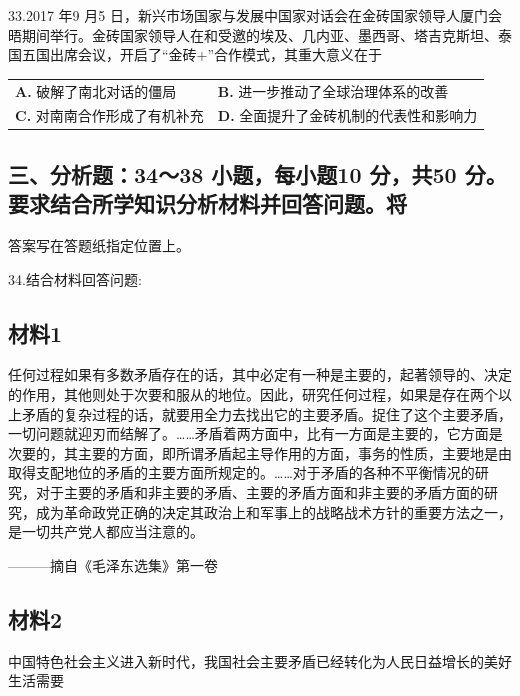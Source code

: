 \documentclass[UTF8,11pt]{ctexart}
\begin{document}
33.2017 年9 月5 日，新兴市场国家与发展中国家对话会在金砖国家领导人厦门会晤期间举行。金砖国家领导人在和受邀的埃及、几内亚、墨西哥、塔吉克斯坦、泰国五国出席会议，开启了“金砖+”合作模式，其重大意义在于


\begin{center}\begin{tabular}{>{\raggedright\arraybackslash}p{\dimexpr(\linewidth-4\tabcolsep)/2\relax}>{\raggedright\arraybackslash}p{\dimexpr(\linewidth-4\tabcolsep)/2\relax}}
\textbf{A.} 破解了南北对话的僵局 & \textbf{B.} 进一步推动了全球治理体系的改善\\[.35em]
\textbf{C.} 对南南合作形成了有机补充 & \textbf{D.} 全面提升了金砖机制的代表性和影响力\\[.35em]\end{tabular}\end{center}

\subsection*{三、分析题：34～38 小题，每小题10 分，共50 分。要求结合所学知识分析材料并回答问题。将}

答案写在答题纸指定位置上。


34.结合材料回答问题:


\subsection*{材料1}

任何过程如果有多数矛盾存在的话，其中必定有一种是主要的，起著领导的、决定的作用，其他则处于次要和服从的地位。因此，研究任何过程，如果是存在两个以上矛盾的复杂过程的话，就要用全力去找出它的主要矛盾。捉住了这个主要矛盾，一切问题就迎刃而结解了。……矛盾着两方面中，比有一方面是主要的，它方面是次要的，其主要的方面，即所谓矛盾起主导作用的方面，事务的性质，主要地是由取得支配地位的矛盾的主要方面所规定的。……对于矛盾的各种不平衡情况的研究，对于主要的矛盾和非主要的矛盾、主要的矛盾方面和非主要的矛盾方面的研究，成为革命政党正确的决定其政治上和军事上的战略战术方针的重要方法之一，是一切共产党人都应当注意的。


———摘自《毛泽东选集》第一卷


\subsection*{材料2}

中国特色社会主义进入新时代，我国社会主要矛盾已经转化为人民日益增长的美好生活需要
\end{document}

